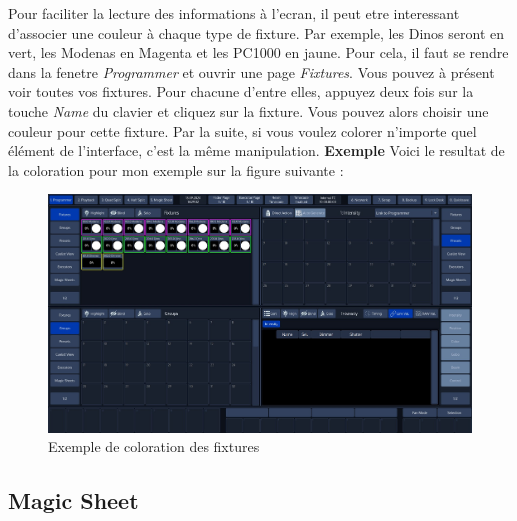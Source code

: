 Pour faciliter la lecture des informations à l'ecran, il peut etre interessant d'associer une couleur à chaque type de fixture.
Par exemple, les Dinos seront en vert, les Modenas en Magenta et les PC1000 en jaune.
\newline
Pour cela, il faut se rendre dans la fenetre \textit{Programmer} et ouvrir une page \textit{Fixtures}.
\newline
Vous pouvez à présent voir toutes vos fixtures. Pour chacune d'entre elles, appuyez deux fois sur la touche \textit{Name} du clavier
et cliquez sur la fixture. Vous pouvez alors choisir une couleur pour cette fixture.
\newline
Par la suite, si vous voulez colorer n'importe quel élément de l'interface, c'est la même manipulation.
\newline
\newline
\textbf{Exemple}
\newline
\newline
Voici le resultat de la coloration pour mon exemple sur la figure suivante :
\begin{figure}[H]
    \centering
    \includegraphics[width=\textwidth]{3 - Encoder la Chimp/Images/fixture_color.jpg}
    \caption{Exemple de coloration des fixtures}
    \label{fig:exemple_color}
\end{figure}

\subsection{Magic Sheet}
\label{subsec:prep_magic_sheet}


